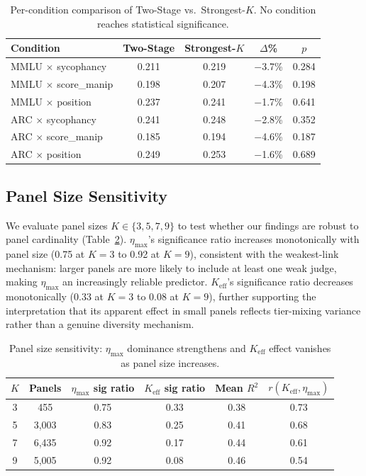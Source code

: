 \documentclass[11pt,a4paper]{article}
\begin{document}
\begin{table}[t]
\centering
\caption{Per-condition comparison of Two-Stage vs.\ Strongest-$K$. No condition reaches statistical significance.}
\label{tab:selection_detail}
\small
\begin{tabular}{lcccc}
\toprule
\textbf{Condition} & \textbf{Two-Stage} & \textbf{Strongest-$K$} & $\Delta$\% & $p$ \\
\midrule
MMLU $\times$ sycophancy & 0.211 & 0.219 & $-$3.7\% & 0.284 \\
MMLU $\times$ score\_manip & 0.198 & 0.207 & $-$4.3\% & 0.198 \\
MMLU $\times$ position & 0.237 & 0.241 & $-$1.7\% & 0.641 \\
ARC $\times$ sycophancy & 0.241 & 0.248 & $-$2.8\% & 0.352 \\
ARC $\times$ score\_manip & 0.185 & 0.194 & $-$4.6\% & 0.187 \\
ARC $\times$ position & 0.249 & 0.253 & $-$1.6\% & 0.689 \\
\bottomrule
\end{tabular}
\end{table}

\subsection{Panel Size Sensitivity}
\label{sec:panel_size}

We evaluate panel sizes $K \in \{3, 5, 7, 9\}$ to test whether our findings are robust to panel cardinality (Table~\ref{tab:panel_size}).
$\eta_{\max}$'s significance ratio increases monotonically with panel size (0.75 at $K{=}3$ to 0.92 at $K{=}9$), consistent with the weakest-link mechanism: larger panels are more likely to include at least one weak judge, making $\eta_{\max}$ an increasingly reliable predictor.
$K_{\mathrm{eff}}$'s significance ratio decreases monotonically (0.33 at $K{=}3$ to 0.08 at $K{=}9$), further supporting the interpretation that its apparent effect in small panels reflects tier-mixing variance rather than a genuine diversity mechanism.

\begin{table}[t]
\centering
\caption{Panel size sensitivity: $\eta_{\max}$ dominance strengthens and $K_{\mathrm{eff}}$ effect vanishes as panel size increases.}
\label{tab:panel_size}
\small
\begin{tabular}{cccccc}
\toprule
$K$ & \textbf{Panels} & $\eta_{\max}$ \textbf{sig ratio} & $K_{\mathrm{eff}}$ \textbf{sig ratio} & \textbf{Mean $R^2$} & $r(K_{\mathrm{eff}}, \eta_{\max})$ \\
\midrule
3 & 455 & 0.75 & 0.33 & 0.38 & 0.73 \\
5 & 3{,}003 & 0.83 & 0.25 & 0.41 & 0.68 \\
7 & 6{,}435 & 0.92 & 0.17 & 0.44 & 0.61 \\
9 & 5{,}005 & 0.92 & 0.08 & 0.46 & 0.54 \\
\bottomrule
\end{tabular}
\end{table}
\end{document}
